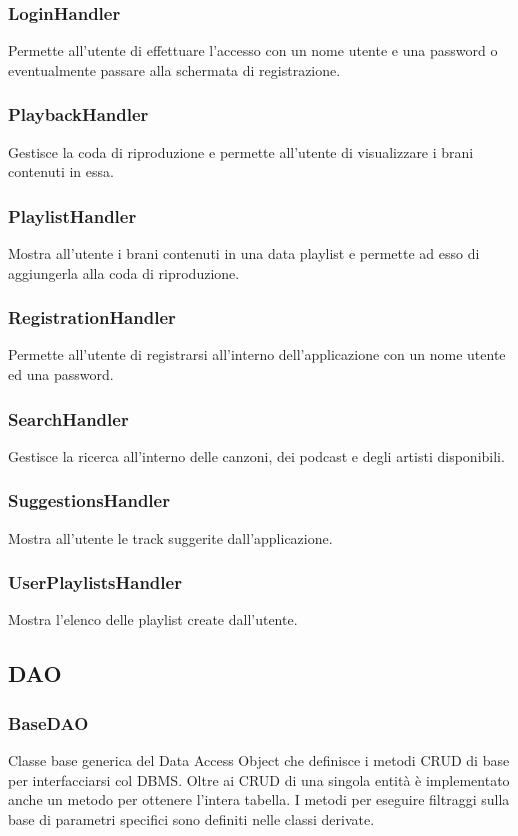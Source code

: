 \documentclass{article}
\begin{document}
  \subsubsection{LoginHandler}
  Permette all'utente di effettuare l'accesso con un nome utente e una password o
  eventualmente passare alla schermata di registrazione.
  \subsubsection{PlaybackHandler}
  Gestisce la coda di riproduzione e permette all'utente di visualizzare i
  brani contenuti in essa.
  \subsubsection{PlaylistHandler}
  Mostra all'utente i brani contenuti in una data playlist e permette ad esso di
  aggiungerla alla coda di riproduzione.
  \subsubsection{RegistrationHandler}
  Permette all'utente di registrarsi all'interno dell'applicazione con un
  nome utente ed una password.
  \subsubsection{SearchHandler}
  Gestisce la ricerca all'interno delle canzoni, dei podcast e degli artisti disponibili.
  \subsubsection{SuggestionsHandler}
  Mostra all'utente le track suggerite dall'applicazione.
  \subsubsection{UserPlaylistsHandler}
  Mostra l'elenco delle playlist create dall'utente.

  \subsection{DAO}

  \subsubsection{BaseDAO}
  Classe base generica del Data Access Object che definisce i metodi CRUD di base per interfacciarsi col DBMS.
  Oltre ai CRUD di una singola entità è implementato anche un metodo per ottenere l'intera tabella. I metodi per eseguire filtraggi sulla base di parametri specifici sono definiti nelle classi derivate.
\end{document}
